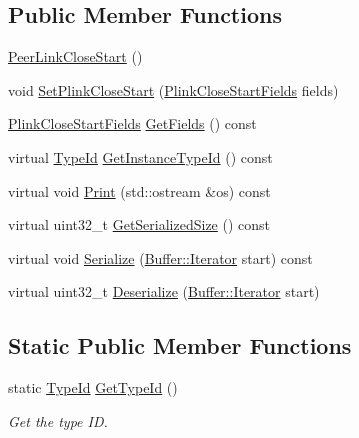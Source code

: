 \subsection*{Public Member Functions}
\begin{DoxyCompactItemize}
\item 
\hyperlink{classns3_1_1dot11s_1_1PeerLinkCloseStart_a3ceee3c6a981b960ade3aa96094d838d}{Peer\+Link\+Close\+Start} ()
\item 
void \hyperlink{classns3_1_1dot11s_1_1PeerLinkCloseStart_aba1cca0da9169bc5fd483c11f246e01f}{Set\+Plink\+Close\+Start} (\hyperlink{structns3_1_1dot11s_1_1PeerLinkCloseStart_1_1PlinkCloseStartFields}{Plink\+Close\+Start\+Fields} fields)
\item 
\hyperlink{structns3_1_1dot11s_1_1PeerLinkCloseStart_1_1PlinkCloseStartFields}{Plink\+Close\+Start\+Fields} \hyperlink{classns3_1_1dot11s_1_1PeerLinkCloseStart_a737b487597645ea9f6c9026d46564a69}{Get\+Fields} () const 
\item 
virtual \hyperlink{classns3_1_1TypeId}{Type\+Id} \hyperlink{classns3_1_1dot11s_1_1PeerLinkCloseStart_ac4e2a2b8eb3a660e12273fba47e54116}{Get\+Instance\+Type\+Id} () const 
\item 
virtual void \hyperlink{classns3_1_1dot11s_1_1PeerLinkCloseStart_a5d84a658b408cd49ea15ca9813dfdcd5}{Print} (std\+::ostream \&os) const 
\item 
virtual uint32\+\_\+t \hyperlink{classns3_1_1dot11s_1_1PeerLinkCloseStart_abf771bfbcd98dc753d8ee3ae3183d0c7}{Get\+Serialized\+Size} () const 
\item 
virtual void \hyperlink{classns3_1_1dot11s_1_1PeerLinkCloseStart_a78a9de8c0a027498640a9fad4d02a4c8}{Serialize} (\hyperlink{classns3_1_1Buffer_1_1Iterator}{Buffer\+::\+Iterator} start) const 
\item 
virtual uint32\+\_\+t \hyperlink{classns3_1_1dot11s_1_1PeerLinkCloseStart_a0c21315898d9ed65222223b4b8a4039d}{Deserialize} (\hyperlink{classns3_1_1Buffer_1_1Iterator}{Buffer\+::\+Iterator} start)
\end{DoxyCompactItemize}
\subsection*{Static Public Member Functions}
\begin{DoxyCompactItemize}
\item 
static \hyperlink{classns3_1_1TypeId}{Type\+Id} \hyperlink{classns3_1_1dot11s_1_1PeerLinkCloseStart_a868aa30528c8562ce11701f19eb19288}{Get\+Type\+Id} ()
\begin{DoxyCompactList}\small\item\em Get the type ID. \end{DoxyCompactList}\end{DoxyCompactItemize}
